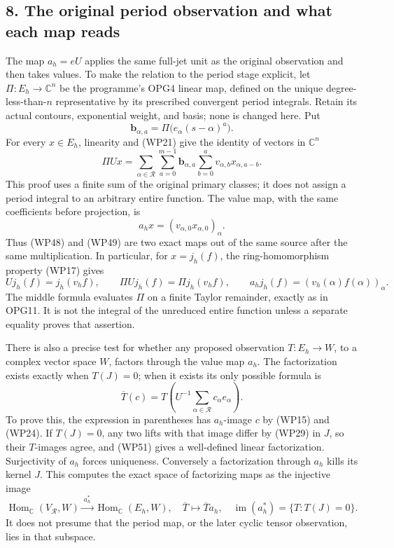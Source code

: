 \documentclass[
  10pt,
  a4paper,
]{article}
\newcounter{none} %
\begin{document}
\subsection{8. The original period observation and what each map
reads}\label{the-original-period-observation-and-what-each-map-reads}

The map \(a_h=eU\) applies the same full-jet unit as the original
observation and then takes values. To make the relation to the period
stage explicit, let \(\Pi:E_h\to\mathbb C^n\) be the programme's OPG4
linear map, defined on the unique degree-less-than-\(n\) representative
by its prescribed convergent period integrals. Retain its actual
contours, exponential weight, and basis; none is changed here. Put \[
\mathbf b_{\alpha,a}=\Pi\bigl(e_\alpha(s-\alpha)^a\bigr).
\tag{WP47}
\] For every \(x\in E_h\), linearity and (WP21) give the identity of
vectors in \(\mathbb C^n\) \[
\Pi Ux=
\sum_{\alpha\in\mathcal R}\sum_{a=0}^{m-1}
\mathbf b_{\alpha,a}
\sum_{b=0}^a v_{\alpha,b}x_{\alpha,a-b}.
\tag{WP48}
\] This proof uses a finite sum of the original primary classes; it does
not assign a period integral to an arbitrary entire function. The value
map, with the same coefficients before projection, is \[
a_hx=(v_{\alpha,0}x_{\alpha,0})_\alpha.
\tag{WP49}
\] Thus (WP48) and (WP49) are two exact maps out of the same source
after the same multiplication. In particular, for \(x=j_h(f)\), the
ring-homomorphism property (WP17) gives \[
Uj_h(f)=j_h(v_hf),\qquad
\Pi Uj_h(f)=\Pi j_h(v_hf),\qquad
a_hj_h(f)=(v_h(\alpha)f(\alpha))_\alpha.
\tag{WP50}
\] The middle formula evaluates \(\Pi\) on a finite Taylor remainder,
exactly as in OPG11. It is not the integral of the unreduced entire
function unless a separate equality proves that assertion.

There is also a precise test for whether any proposed observation
\(T:E_h\to W\), to a complex vector space \(W\), factors through the
value map \(a_h\). The factorization exists exactly when \(T(J)=0\);
when it exists its only possible formula is \[
\overline T(c)=T\left(U^{-1}\sum_{\alpha\in\mathcal R}c_\alpha e_\alpha\right).
\tag{WP51}
\] To prove this, the expression in parentheses has \(a_h\)-image \(c\)
by (WP15) and (WP24). If \(T(J)=0\), any two lifts with that image
differ by (WP29) in \(J\), so their \(T\)-images agree, and (WP51) gives
a well-defined linear factorization. Surjectivity of \(a_h\) forces
uniqueness. Conversely a factorization through \(a_h\) kills its kernel
\(J\). This computes the exact space of factorizing maps as the
injective image \[
\operatorname{Hom}_{\mathbb C}(V_{\mathcal R},W)
\xrightarrow{\ a_h^*\ }
\operatorname{Hom}_{\mathbb C}(E_h,W),
\quad \overline T\longmapsto\overline T a_h,
\quad
\operatorname{im}(a_h^*)=\{T:T(J)=0\}.
\tag{WP52}
\] It does not presume that the period map, or the later cyclic tensor
observation, lies in that subspace.
\end{document}

